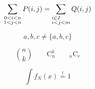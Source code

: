 \documentclass{article}
\begin{document}
\begin{displaymath}
\sum_{\substack{0<i<n \\ 1<j<n}}
P(i, j) = \sum_{\begin{subarray}{1} i\in I \\ i<j<m
\end{subarray}} Q(i, j)
\end{displaymath}

\begin{displaymath}
{a, b, c}\neq\{a, b, c\}
\end{displaymath}


\begin{displaymath}
\binom{n}{k} \qquad \mathrm{C}_n^k \qquad _n\mathrm{C}_r
\end{displaymath}

\begin{displaymath}
\int f_N(x) \stackrel{!}{=} 1
\end{displaymath}
\end{document}
